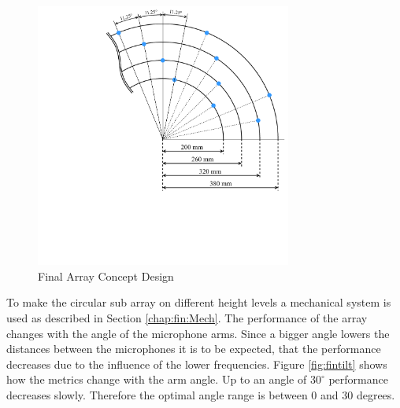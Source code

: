 \begin{figure}[h]
	\centering
	\includegraphics[width=0.75\textwidth, trim={5.5cm 6.0cm 0 0}]{images/5_array_evaluation/final_array_concept_design.pdf}
	\caption{Final Array Concept Design}
	\label{fig:final_array_concept_design}
\end{figure}


To make the circular sub array on different height levels
a mechanical system is used as described in Section \ref{chap:fin:Mech}.
The performance of the array changes with the angle of the microphone arms.
Since a bigger angle lowers the distances between the microphones it is to be 
expected, that the performance decreases due to the influence of the lower frequencies.
Figure \ref*{fig:fintilt} shows how the metrics change with the arm angle.
Up to an angle of $30^\circ$ performance decreases slowly.
Therefore the optimal angle range is between 0 and 30 degrees.

